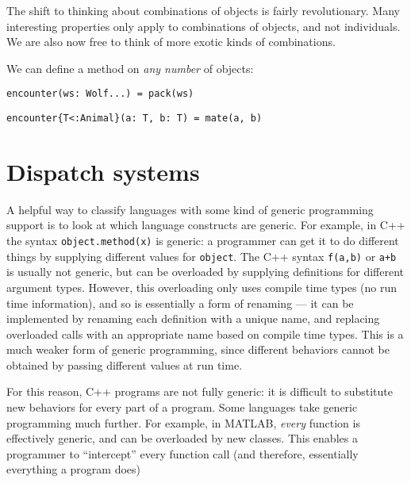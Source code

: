 The shift to thinking about combinations of objects is fairly revolutionary.
Many interesting properties only apply to combinations of objects, and not
individuals.
We are also now free to think of more exotic kinds of combinations.

We can define a method on \emph{any number} of objects:

\begin{verbatim}
encounter(ws: Wolf...) = pack(ws)
\end{verbatim}


\begin{verbatim}
encounter{T<:Animal}(a: T, b: T) = mate(a, b)
\end{verbatim}



\section{Dispatch systems}



A helpful way to classify languages with some kind of generic programming
support is to look at which language constructs are generic. For example,
in C++ the syntax \texttt{object.method(x)} is generic: a programmer can
get it to do different things by supplying different values for
\texttt{object}. The C++ syntax \texttt{f(a,b)} or \texttt{a+b} is
usually not generic, but can be overloaded by supplying definitions for
different argument types. However, this overloading only uses compile time
types (no run time information), and so is essentially a form of renaming ---
it can be implemented by renaming each definition with a unique name, and
replacing overloaded calls with an appropriate name based on compile time
types. This is a much weaker form of generic programming, since different
behaviors cannot be obtained by passing different values at run time.

For this reason, C++ programs are not fully generic: it is difficult to
substitute new behaviors for every part of a program. Some languages
take generic programming much further. For example, in MATLAB, \emph{every}
function is effectively generic, and can be overloaded by new classes.
This enables a programmer to ``intercept'' every function call (and therefore,
essentially everything a program does)


